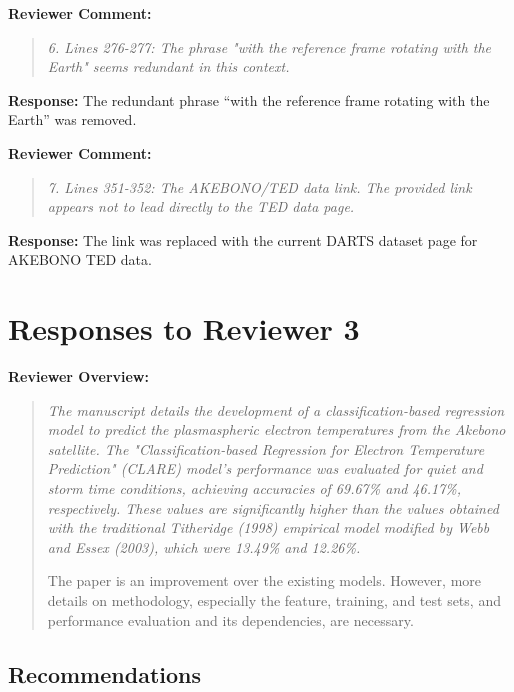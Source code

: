 \documentclass[a4paper,12pt]{article}
\newcommand{\reviewercomment}[1]{%
  \begin{samepage}%
  \par\noindent\textbf{Reviewer Comment:}\par
  \begin{quote}\itshape #1\end{quote}}
\newcommand{\reviewercontext}[1]{%
  \par\noindent\textbf{Reviewer Overview:}\par
  \begin{quote}\itshape #1\end{quote}}
\newcommand{\filledresponse}[1]{%
  \par\noindent\textbf{Response:} #1\par
  \vspace{0.4cm}%
  \end{samepage}}
\begin{document}
\reviewercomment{6. Lines 276-277: The phrase "with the reference frame rotating with the Earth" seems redundant in
this context.}
\filledresponse{The redundant phrase ``with the reference frame rotating with the Earth'' was removed.}

\reviewercomment{7. Lines 351-352: The AKEBONO/TED data link. The provided link appears not to lead directly to the
TED data page.}
\filledresponse{The link was replaced with the current DARTS dataset page for AKEBONO TED data.}

\newpage
\section*{Responses to Reviewer 3}

\reviewercontext{The manuscript details the development of a classification-based regression model to predict the
plasmaspheric electron temperatures from the Akebono satellite. The "Classification-based Regression
for Electron Temperature Prediction" (CLARE) model's performance was evaluated for quiet and storm
time conditions, achieving accuracies of 69.67\% and 46.17\%, respectively. These values are
significantly higher than the values obtained with the traditional Titheridge (1998) empirical model
modified by Webb and Essex (2003), which were 13.49\% and 12.26\%.

The paper is an improvement over the existing models. However, more details on methodology,
especially the feature, training, and test sets, and performance evaluation and its dependencies,
are necessary.}

\subsection*{Recommendations}
\end{document}
